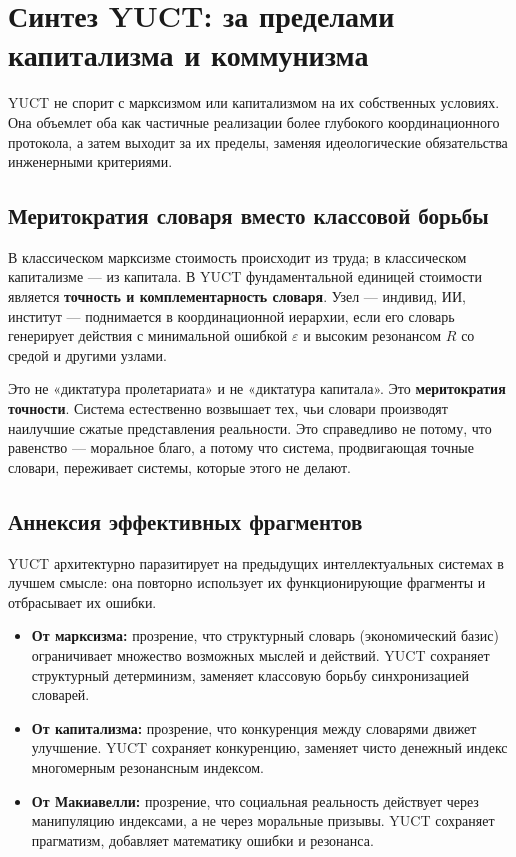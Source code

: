 \documentclass[12pt,a4paper]{article}
\begin{document}
	\section{Синтез YUCT: за пределами капитализма и коммунизма}
	\label{sec:yuct-synthesis}
	
	YUCT не спорит с марксизмом или капитализмом на их собственных условиях. Она объемлет оба как частичные реализации более глубокого координационного протокола, а затем выходит за их пределы, заменяя идеологические обязательства инженерными критериями.
	
	\subsection{Меритократия словаря вместо классовой борьбы}
	
	В классическом марксизме стоимость происходит из труда; в классическом капитализме — из капитала. В YUCT фундаментальной единицей стоимости является \textbf{точность и комплементарность словаря}. Узел — индивид, ИИ, институт — поднимается в координационной иерархии, если его словарь генерирует действия с минимальной ошибкой \(\varepsilon\) и высоким резонансом \(R\) со средой и другими узлами.
	
	Это не «диктатура пролетариата» и не «диктатура капитала». Это \textbf{меритократия точности}. Система естественно возвышает тех, чьи словари производят наилучшие сжатые представления реальности. Это справедливо не потому, что равенство — моральное благо, а потому что система, продвигающая точные словари, переживает системы, которые этого не делают.
	
	\subsection{Аннексия эффективных фрагментов}
	
	YUCT архитектурно паразитирует на предыдущих интеллектуальных системах в лучшем смысле: она повторно использует их функционирующие фрагменты и отбрасывает их ошибки.
	
	\begin{itemize}[leftmargin=*]
		\item \textbf{От марксизма:} прозрение, что структурный словарь (экономический базис) ограничивает множество возможных мыслей и действий. YUCT сохраняет структурный детерминизм, заменяет классовую борьбу синхронизацией словарей.
		\item \textbf{От капитализма:} прозрение, что конкуренция между словарями движет улучшение. YUCT сохраняет конкуренцию, заменяет чисто денежный индекс многомерным резонансным индексом.
		\item \textbf{От Макиавелли:} прозрение, что социальная реальность действует через манипуляцию индексами, а не через моральные призывы. YUCT сохраняет прагматизм, добавляет математику ошибки и резонанса.
	\end{itemize}
	
\end{document}
